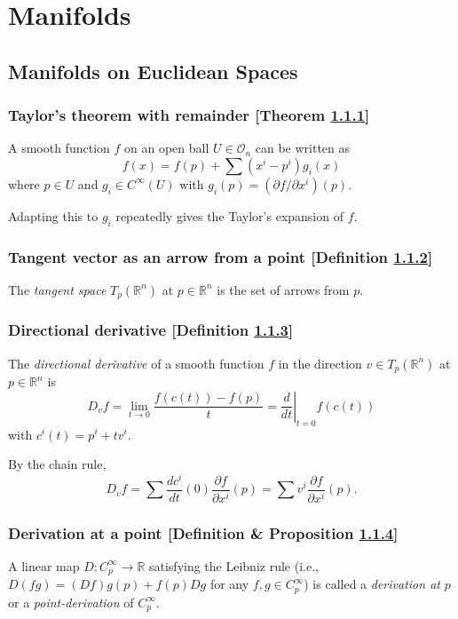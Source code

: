 \documentclass[13pt,uplatex,dvipdfmx]{jsarticle}
\theoremstyle{definition}
\newcommand{\bb}[1]{\mathbb{#1}}
\newcommand{\pfrac}[2]{\frac{\partial #1}{\partial #2}}
\begin{document}
\section{Manifolds}
\subsection{Manifolds on Euclidean Spaces}
\subsubsection{Taylor's theorem with remainder [Theorem \ref{taylors-theorem-with-remainder}]}\label{taylors-theorem-with-remainder}
A smooth function $f$ on an open ball $U \in \mathcal{O}_n$ can be written as
\[
f(x) = f(p) + \sum (x^i - p^i) g_i(x)
\]
where $p \in U$ and $g_i \in C^\infty (U)$ with $g_i(p) = (\partial f / \partial x^i)(p)$.	

Adapting this to $g_i$ repeatedly gives the Taylor's expansion of $f$.

\subsubsection{Tangent vector as an arrow from a point [Definition \ref{tangent-vector-as-an-arrow-from-a-point}]}\label{tangent-vector-as-an-arrow-from-a-point}
The \textit{tangent space} $T_p (\bb{R}^n)$ at $p \in \bb{R}^n$ is the set of arrows from $p$.

\subsubsection{Directional derivative [Definition \ref{directional-derivative}]}\label{directional-derivative}
The \textit{directional derivative} of a smooth function $f$ in the direction $v \in T_p(\bb{R}^n)$ at $p \in \bb{R}^n$ is
\[
D_v f = \lim_{t \to 0} \frac{f(c(t)) - f(p)}{t} = \left. \frac{d}{dt}\right|_{t=0} f(c(t))
\]
with $c^i(t) = p^i + tv^i$.

By the chain rule,
\[
D_v f = \sum \frac{dc^i}{dt}(0)\pfrac{f}{x^i}(p) = \sum v^i \pfrac{f}{x^i}(p).
\]

\subsubsection{Derivation at a point [Definition \& Proposition \ref{derivation-at-a-point}]}\label{derivation-at-a-point}
A linear map $D \colon C_p^\infty \to \bb{R}$ satisfying the Leibniz rule (i.e., $D(fg) = (D f)g(p) + f(p)D g$ for any $f, g \in C_p^\infty$) is called a \textit{derivation at} $p$ or a \textit{point-derivation} of $C_p^\infty$.
\end{document}
